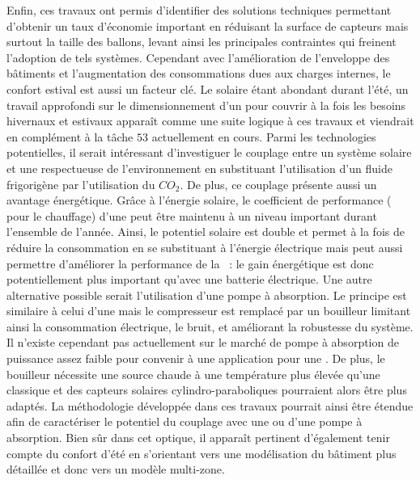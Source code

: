 Enfin, ces travaux ont permis d’identifier des solutions techniques permettant d’obtenir un taux
d’économie important en réduisant la surface de capteurs mais surtout la taille des
ballons, levant ainsi les principales contraintes qui freinent l’adoption de tels
systèmes. Cependant avec l’amélioration de l’enveloppe des bâtiments et l’augmentation des
consommations dues aux charges internes, le confort estival est aussi un facteur clé. Le
solaire étant abondant durant l’été, un travail approfondi sur le dimensionnement d’un
 pour couvrir à la fois les besoins hivernaux et estivaux apparaît comme une suite
logique à ces travaux et viendrait en complément à la tâche $53$ actuellement en cours.
Parmi les technologies potentielles, il serait intéressant d’investiguer le couplage entre
un système solaire et une  respectueuse de l’environnement en substituant
l’utilisation d’un fluide frigorigène par l’utilisation du $CO_{2}$. De plus, ce couplage présente aussi un
avantage énergétique. Grâce à l’énergie solaire,
le coefficient de performance ( pour le chauffage) d’une  peut être maintenu à un niveau important durant
l’ensemble de l’année. Ainsi, le potentiel solaire est double et permet à la fois de
réduire la consommation en se substituant à l’énergie électrique mais peut aussi permettre d’améliorer
la performance de la ~: le gain énergétique est donc potentiellement plus
important qu’avec une batterie électrique. Une autre alternative possible serait
l’utilisation d’une pompe à absorption. Le principe est similaire à celui d’une 
mais le compresseur est remplacé par un bouilleur limitant ainsi la consommation
électrique, le bruit, et améliorant la robustesse du système. Il n’existe cependant pas
actuellement sur le marché de pompe à absorption de puissance assez faible pour convenir à
une application pour une . De plus, le bouilleur nécessite une source chaude à
une température plus élevée qu’une  classique et des capteurs solaires
cylindro-paraboliques pourraient alors être plus adaptés. La méthodologie développée dans ces travaux
pourrait ainsi être étendue afin de caractériser le potentiel du couplage avec une
 ou d’une pompe à absorption. Bien sûr dans cet optique, il apparaît pertinent
d’également tenir compte du confort d’été en s’orientant vers une modélisation du bâtiment plus
détaillée et donc vers un modèle multi-zone.
